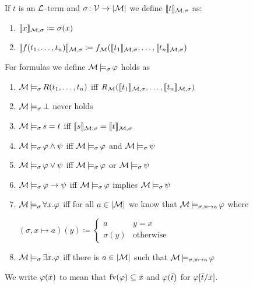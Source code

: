 \begin{defi}
    If $t$ is an $\mathcal{L}$-term and $\sigma \colon \mathcal{V} \to \lvert \mathcal{M} \rvert$ we define \alert{$\llbracket t \rrbracket_{\mathcal{M}, \sigma}$} as: 
    \begin{enumerate}
        \item $\llbracket x \rrbracket_{\mathcal{M}, \sigma} \coloneq \sigma(x)$
        \item $\llbracket f(t_1, \dots, t_n) \rrbracket_{\mathcal{M}, \sigma} \coloneq f_{\mathcal{M}}(\llbracket t_1 \rrbracket_{\mathcal{M}, \sigma}, \dots, \llbracket t_n \rrbracket_{\mathcal{M}, \sigma})$
    \end{enumerate}
    For formulas we define \alert{$\mathcal{M} \operatorname{\models_{\sigma}} \varphi$} holds as 
    \begin{enumerate}
        \item $\mathcal{M} \operatorname{\models_{\sigma}} R(t_1, \dots, t_n)$ iff $R_{\mathcal{M}}(\llbracket t_1 \rrbracket_{\mathcal{M}, \sigma}, \dots, \llbracket t_n \rrbracket_{\mathcal{M}, \sigma})$
        \item $\mathcal{M} \operatorname{\models_{\sigma}} \bot$ never holds
        \item $\mathcal{M} \operatorname{\models_{\sigma}} s = t$ iff $\llbracket s \rrbracket_{\mathcal{M}, \sigma} = \llbracket t \rrbracket_{\mathcal{M}, \sigma}$
        \item $\mathcal{M} \operatorname{\models_{\sigma}} \varphi \wedge \psi$ iff $\mathcal{M} \operatorname{\models_{\sigma}} \varphi$ and $\mathcal{M} \operatorname{\models_{\sigma}} \psi$
        \item $\mathcal{M} \operatorname{\models_{\sigma}} \varphi \lor \psi$ iff $\mathcal{M} \operatorname{\models_{\sigma}} \varphi$ or $\mathcal{M} \operatorname{\models_{\sigma}} \psi$
        \item $\mathcal{M} \operatorname{\models_{\sigma}} \varphi \to \psi$ iff $\mathcal{M} \operatorname{\models_{\sigma}} \varphi$ implies $\mathcal{M} \operatorname{\models_{\sigma}} \psi$
        \item $\mathcal{M} \operatorname{\models_{\sigma}} \forall x. \varphi$ iff for all $a \in \lvert \mathcal{M} \rvert$ we know that $\mathcal{M} \operatorname{\models_{\sigma, x \mapsto a}} \varphi$ where 
        
        $(\sigma, x \mapsto a)(y) \coloneq
        \begin{cases}
            a & y = x \\
            \sigma(y) & \text{otherwise}
        \end{cases}$
        \item $\mathcal{M} \operatorname{\models_{\sigma}} \exists x. \varphi$ iff there is $a \in \lvert \mathcal{M} \rvert$ such that $\mathcal{M} \operatorname{\models_{\sigma, x \mapsto a}} \varphi$
    \end{enumerate}
\end{defi}

\begin{rem}
    We write \alert{$\varphi(\bar{x})$} to mean that $\text{fv}(\varphi) \subseteq \bar{x}$ and \alert{$\varphi(\bar{t})$} for $\varphi[\bar{t}/\bar{x}]$.
\end{rem}

